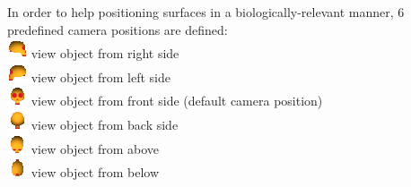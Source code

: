 \documentclass[12pt, a4paper]{book}
\begin{document}
In order to help positioning surfaces in a biologically-relevant manner, 6 predefined camera positions are defined:\\
\includegraphics[scale=0.7]{../images/06/camera/camera_right.png} view object from right side \\
\includegraphics[scale=0.7]{../images/06/camera/camera_left.png} view object from left side\\
\includegraphics[scale=0.7]{../images/06/camera/camera_front.png} view object from front side (default camera position)\\
\includegraphics[scale=0.7]{../images/06/camera/camera_back.png} view object from back side\\
\includegraphics[scale=0.7]{../images/06/camera/camera_above.png} view object from above\\
\includegraphics[scale=0.7]{../images/06/camera/camera_below.png} view object from below\\
\end{document}
